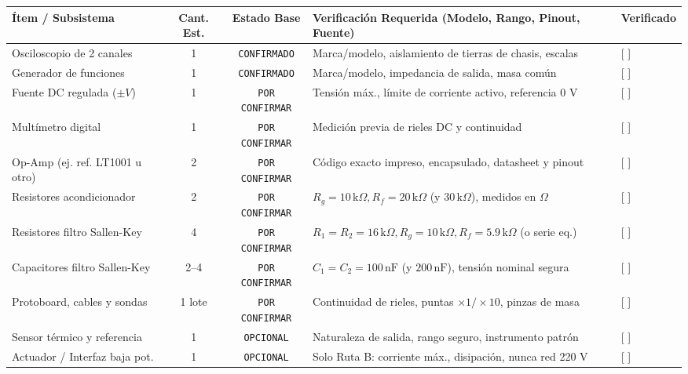 \documentclass[11pt, a4paper]{article}
\begin{document}
\begin{center}
\begin{tabularx}{\textwidth}{@{} l c c X l @{}}
\toprule
\textbf{Ítem / Subsistema} & \textbf{Cant. Est.} & \textbf{Estado Base} & \textbf{Verificación Requerida (Modelo, Rango, Pinout, Fuente)} & \textbf{Verificado} \\ \midrule
Osciloscopio de 2 canales & 1 & \texttt{CONFIRMADO} & Marca/modelo, aislamiento de tierras de chasis, escalas & [ \quad ] \\ \addlinespace[4pt]
Generador de funciones & 1 & \texttt{CONFIRMADO} & Marca/modelo, impedancia de salida, masa común & [ \quad ] \\ \addlinespace[4pt]
Fuente DC regulada ($\pm V$) & 1 & \texttt{POR CONFIRMAR} & Tensión máx., límite de corriente activo, referencia 0 V & [ \quad ] \\ \addlinespace[4pt]
Multímetro digital & 1 & \texttt{POR CONFIRMAR} & Medición previa de rieles DC y continuidad & [ \quad ] \\ \addlinespace[4pt]
Op-Amp (ej. ref. LT1001 u otro) & 2 & \texttt{POR CONFIRMAR} & Código exacto impreso, encapsulado, datasheet y pinout & [ \quad ] \\ \addlinespace[4pt]
Resistores acondicionador & 2 & \texttt{POR CONFIRMAR} & $R_g = 10\,\text{k}\Omega, R_f = 20\,\text{k}\Omega$ (y $30\,\text{k}\Omega$), medidos en $\Omega$ & [ \quad ] \\ \addlinespace[4pt]
Resistores filtro Sallen-Key & 4 & \texttt{POR CONFIRMAR} & $R_1=R_2=16\,\text{k}\Omega, R_g=10\,\text{k}\Omega, R_f=5.9\,\text{k}\Omega$ (o serie eq.) & [ \quad ] \\ \addlinespace[4pt]
Capacitores filtro Sallen-Key & 2--4 & \texttt{POR CONFIRMAR} & $C_1=C_2=100\,\text{nF}$ (y $200\,\text{nF}$), tensión nominal segura & [ \quad ] \\ \addlinespace[4pt]
Protoboard, cables y sondas & 1 lote & \texttt{POR CONFIRMAR} & Continuidad de rieles, puntas $\times 1/\times 10$, pinzas de masa & [ \quad ] \\ \addlinespace[4pt]
Sensor térmico y referencia & 1 & \texttt{OPCIONAL} & Naturaleza de salida, rango seguro, instrumento patrón & [ \quad ] \\ \addlinespace[4pt]
Actuador / Interfaz baja pot. & 1 & \texttt{OPCIONAL} & Solo Ruta B: corriente máx., disipación, nunca red 220 V & [ \quad ] \\ \bottomrule
\end{tabularx}
\end{center}
\end{document}
